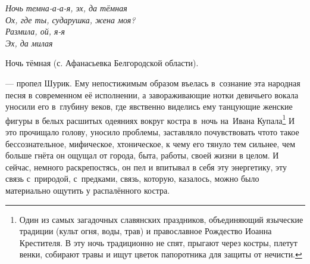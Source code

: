 \newpage
\noindent\textit{%
	\hspace*{2.5cm}Ночь темна-а-а-я, эх, да тёмная\\
	\hspace*{2.5cm}Ох, где ты, сударушка, жена моя?\\
	\hspace*{2.5cm}Размила, ой, я-я\\
	\hspace*{2.5cm}Эх, да милая\myldots{}\\
}

\vspace{-0.5cm}
{\raggedleft \scriptsize \mdash Ночь тёмная (с. Афанасьевка Белгородской области). \par}
%

\renewcommand*{\thefootnote}{\fnsymbol{footnote}}
\setcounter{footnote}{0}

\noindent--- пропел Шурик. Ему непостижимым образом въелась в~сознание эта народная песня в современном её исполнении, а завораживающие нотки девичьего вокала уносили его в~глубину веков, где явственно виделись ему танцующие женские фигуры в белых расшитых одеяниях вокруг костра в~ночь на~Ивана Купала\footnote{Один из самых загадочных славянских праздников, объединяющий языческие традиции (культ огня, воды, трав) и православное Рождество Иоанна Крестителя. В эту ночь традиционно не спят, прыгают через костры, плетут венки, собирают травы и ищут цветок папоротника для защиты от нечисти.}\myldots{} И это прочищало голову, уносило проблемы, заставляло почувствовать что\sdash то такое бессознательное, мифическое, хтоническое, к чему его тянуло тем сильнее, чем больше гнёта он ощущал от города, быта, работы, своей жизни в целом. И сейчас, немного раскрепостясь, он пел и впитывал в себя эту энергетику, эту связь с~природой, с~предками, связь, которую, казалось, можно было материально ощутить у распалённого костра.

